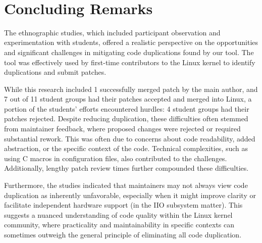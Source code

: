 \documentclass[10pt,conference]{IEEEtran}
\begin{document}
\hfill\\

\section{Concluding Remarks}

The ethnographic studies, which included participant observation and experimentation with students, offered a realistic perspective on the opportunities and significant challenges in mitigating code duplications found by our tool. The tool was effectively used by first-time contributors to the Linux kernel to identify duplications and submit patches.

While this research included 1 successfully merged patch by the main author, and 7 out of 11 student groups had their patches accepted and merged into Linux, a portion of the students' efforts encountered hurdles: 4 student groups had their patches rejected.
Despite reducing duplication, these difficulties often stemmed from maintainer feedback, where proposed changes were rejected or required substantial rework. This was often due to concerns about code readability, added abstraction, or the specific context of the code. Technical complexities, such as using C macros in configuration files, also contributed to the challenges. Additionally, lengthy patch review times further compounded these difficulties.

Furthermore, the studies indicated that maintainers may not always view code duplication as inherently unfavorable, especially when it might improve clarity or facilitate independent hardware support (in the IIO subsystem matter). This suggests a nuanced understanding of code quality within the Linux kernel community, where practicality and maintainability in specific contexts can sometimes outweigh the general principle of eliminating all code duplication.






\end{document}
